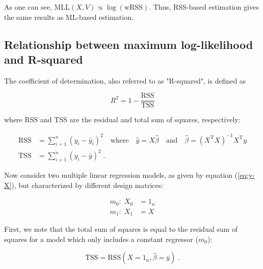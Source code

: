 \documentclass[a4paper,12pt]{article}
\begin{document}
As one can see, $\mathrm{MLL}(X,V) \propto \log(\mathrm{wRSS})$. Thus, RSS-based estimation gives the same results as ML-based estimation.


\pagebreak
\setcounter{equation}{0}
\subsection{Relationship between maximum log-likelihood and R-squared} \label{sec:App-C}

The coefficient of determination, also referred to as "R-squared", is defined as

\begin{equation} \label{eq:R2}
R^2 = 1 - \frac{\mathrm{RSS}}{\mathrm{TSS}}
\end{equation}

where $\mathrm{RSS}$ and $\mathrm{TSS}$ are the residual and total sum of squares, respectively:

\vspace{-0.5em}
\begin{equation} \label{eq:RSS-TSS}
\begin{split}
\mathrm{RSS} &= \sum_{i=1}^n (y_i - \hat{y}_i)^2 \quad \text{where} \quad \hat{y} = X\hat{\beta} \quad \text{and} \quad \hat{\beta} = (X^\mathrm{T} X)^{-1} X^\mathrm{T} y \\
\mathrm{TSS} &= \sum_{i=1}^n (y_i - \bar{y})^2 \; .
\end{split}
\end{equation}

Now consider two multiple linear regression models, as given by equation (\ref{eq:y-X}), but characterized by different design matrices:

\vspace{-0.5em}
\begin{equation} \label{eq:m0-m1}
\begin{split}
m_0: \; X_0 &= 1_n \\
m_1: \; X_1 &= X
\end{split}
\end{equation}

First, we note that the total sum of squares is equal to the residual sum of squares for a model which only includes a constant regressor ($m_0$):

\begin{equation} \label{eq:TSS-m0}
\mathrm{TSS} = \mathrm{RSS}\left( X=1_n, \hat{\beta}=\bar{y} \right) \; .
\end{equation}
\end{document}
